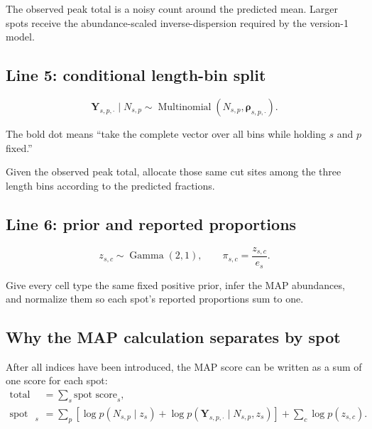 \documentclass[11pt]{article}
\newcommand{\Mult}{\operatorname{Multinomial}}
\newcommand{\Gam}{\operatorname{Gamma}}
\begin{document}
\begin{translation}
The observed peak total is a noisy count around the predicted mean. Larger spots
receive the abundance-scaled inverse-dispersion required by the version-1 model.
\end{translation}

\subsection{Line 5: conditional length-bin split}

\[
\boxed{
\boldsymbol Y_{s,p,\boldsymbol\cdot}\mid N_{s,p}
\sim
\Mult\!\left(
N_{s,p},
\boldsymbol\rho_{s,p,\boldsymbol\cdot}
\right).
}
\]

The bold dot means “take the complete vector over all bins while holding \(s\)
and \(p\) fixed.”

\begin{translation}
Given the observed peak total, allocate those same cut sites among the three
length bins according to the predicted fractions.
\end{translation}

\subsection{Line 6: prior and reported proportions}

\[
\boxed{
z_{s,c}\sim\Gam(2,1),
\qquad
\pi_{s,c}=\frac{z_{s,c}}{e_s}.
}
\]

\begin{translation}
Give every cell type the same fixed positive prior, infer the MAP abundances, and
normalize them so each spot's reported proportions sum to one.
\end{translation}

\subsection{Why the MAP calculation separates by spot}

After all indices have been introduced, the MAP score can be written as a sum of
one score for each spot:
\[
\begin{aligned}
\text{total MAP score}
&=\sum_s \text{spot score}_s,\\[2pt]
\text{spot score}_s
&=\sum_p\left[
  \log p(N_{s,p}\mid z_s)
  +\log p(\boldsymbol Y_{s,p,\cdot}\mid N_{s,p},z_s)
  \right]
  +\sum_c\log p(z_{s,c}).
\end{aligned}
\]
\end{document}
